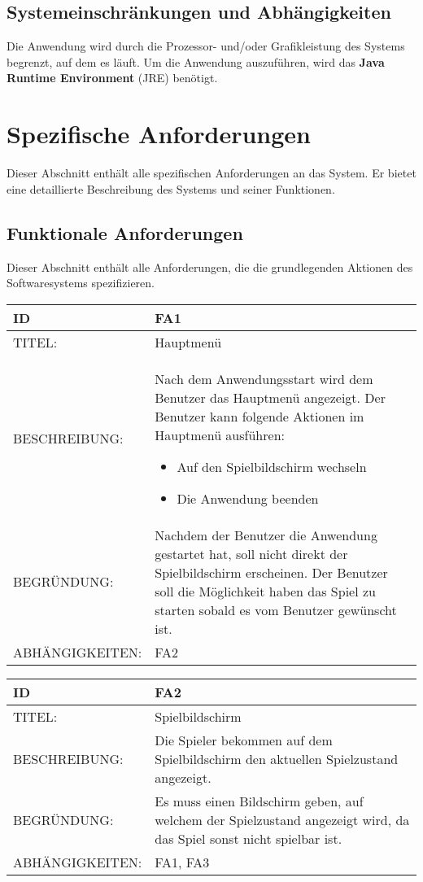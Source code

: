 \documentclass{uulm-assignment}
\begin{document}
\subsection{Systemeinschränkungen und Abhängigkeiten}

Die Anwendung wird durch die Prozessor- und/oder Grafikleistung des Systems begrenzt, auf dem es
läuft. Um die Anwendung auszuführen, wird das \textbf{Java Runtime Environment} (JRE) benötigt.

\section{Spezifische Anforderungen}

Dieser Abschnitt enthält alle spezifischen Anforderungen an das System. Er bietet eine detaillierte
Beschreibung des Systems und seiner Funktionen.

\subsection{Funktionale Anforderungen}

Dieser Abschnitt enthält alle Anforderungen, die die grundlegenden Aktionen des Softwaresystems
spezifizieren.

\begin{tabularx}{16cm}{l|X}
\textbf{ID} & \textbf{FA1} \\
\hline
TITEL: & Hauptmenü \\
\hline
BESCHREIBUNG: & Nach dem Anwendungsstart wird dem Benutzer das Hauptmenü angezeigt. Der Benutzer kann folgende Aktionen im Hauptmenü ausführen: 
\begin{itemize}
\item Auf den Spielbildschirm wechseln
\item Die Anwendung beenden
\end{itemize}
\\
\hline
BEGRÜNDUNG: & Nachdem der Benutzer die Anwendung gestartet hat, soll nicht direkt der Spielbildschirm erscheinen.
Der Benutzer soll die Möglichkeit haben das Spiel zu starten sobald es vom Benutzer gewünscht ist.\\
\hline
ABHÄNGIGKEITEN: & FA2\\
\end{tabularx}

\begin{tabularx}{16cm}{l|X}
\textbf{ID} & \textbf{FA2} \\
\hline
TITEL: & Spielbildschirm \\
\hline
BESCHREIBUNG: & Die Spieler bekommen auf dem Spielbildschirm den aktuellen Spielzustand angezeigt.
\\
\hline
BEGRÜNDUNG: & Es muss einen Bildschirm geben, auf welchem der Spielzustand angezeigt wird, da das Spiel
sonst nicht spielbar ist. \\
\hline
ABHÄNGIGKEITEN: & FA1, FA3\\
\end{tabularx}
\end{document}

